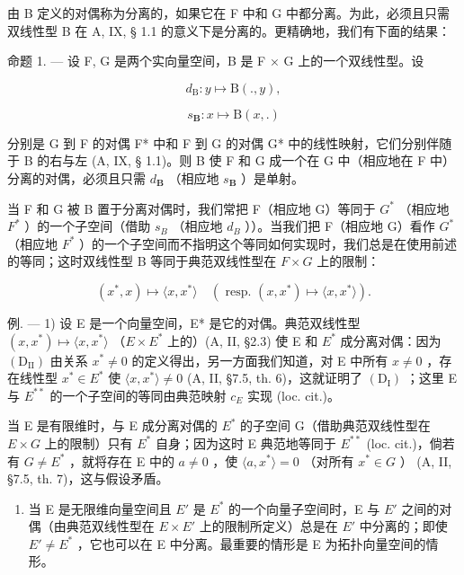 由 B 定义的对偶称为分离的，如果它在 F 中和 G 中都分离。为此，必须且只需双线性型 B 在 A, IX, § 1.1 的意义下是分离的。更精确地，我们有下面的结果：

命题 1. --- 设 F, G 是两个实向量空间，B 是 F × G 上的一个双线性型。设

\[
d _ {\mathrm{B}}: y \mapsto \mathrm{B} (., y),
\]

\[
s _ {\mathbf {B}} \colon x \mapsto \mathrm{B} (x,.)
\]

分别是 G 到 F 的对偶 F* 中和 F 到 G 的对偶 G* 中的线性映射，它们分别伴随于 B 的右与左 (A, IX, § 1.1)。则 B 使 F 和 G 成一个在 G 中（相应地在 F 中）分离的对偶，必须且只需 \(d_{\mathbf{B}}\) （相应地 \(s_{\mathbf{B}}\) ）是单射。

当 F 和 G 被 B 置于分离对偶时，我们常把 F（相应地 G）等同于 \(G^{*}\) （相应地 \(F^{*}\) ）的一个子空间（借助 \(s_{B}\) （相应地 \(d_{B}\) ））。当我们把 F（相应地 G）看作 \(G^{*}\) （相应地 \(F^{*}\) ）的一个子空间而不指明这个等同如何实现时，我们总是在使用前述的等同；这时双线性型 B 等同于典范双线性型在 \(F \times G\) 上的限制：

\[
(x ^ {*}, x) \mapsto \langle x, x ^ {*} \rangle \quad (\text { resp. } (x, x ^ {*}) \mapsto \langle x, x ^ {*} \rangle).
\]

例. --- 1) 设 E 是一个向量空间，E* 是它的对偶。典范双线性型 \((x, x^{*}) \mapsto \langle x, x^{*} \rangle\) （\(E \times E^{*}\) 上的）(A, II, §2.3) 使 E 和 \(E^{*}\) 成分离对偶：因为 \((\mathrm{D}_{\mathrm{II}})\) 由关系 \(x^{*} \neq 0\) 的定义得出，另一方面我们知道，对 E 中所有 \(x \neq 0\) ，存在线性型 \(x^{*} \in E^{*}\) 使 \(\langle x, x^{*} \rangle \neq 0\) (A, II, §7.5, th. 6)，这就证明了 \((\mathrm{D}_{\mathrm{I}})\) ；这里 E 与 \(E^{**}\) 的一个子空间的等同由典范映射 \(c_{E}\) 实现 (loc. cit.)。

当 E 是有限维时，与 E 成分离对偶的 \(E^{*}\) 的子空间 G（借助典范双线性型在 \(E \times G\) 上的限制）只有 \(E^{*}\) 自身；因为这时 E 典范地等同于 \(E^{**}\) (loc. cit.)，倘若有 \(G \neq E^{*}\) ，就将存在 E 中的 \(a \neq 0\) ，使 \(\langle a, x^{*} \rangle = 0\) （对所有 \(x^{*} \in G\) ） (A, II, §7.5, th. 7)，这与假设矛盾。

\begin{enumerate}
\def\labelenumi{\arabic{enumi})}
\setcounter{enumi}{1}
\tightlist
\item
  当 E 是无限维向量空间且 \(E'\) 是 \(E^{*}\) 的一个向量子空间时，E 与 \(E'\) 之间的对偶（由典范双线性型在 \(E \times E'\) 上的限制所定义）总是在 \(E'\) 中分离的；即使 \(E' \neq E^{*}\) ，它也可以在 E 中分离。最重要的情形是 E 为拓扑向量空间的情形。
\end{enumerate}

